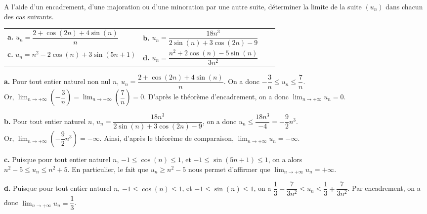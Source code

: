 \documentclass[11pt,fleqn, openany]{book} %
\begin{document}
\begin{exercise}[topic=lim11] A l'aide d'un encadrement, d'une majoration ou d'une minoration par une autre suite, déterminer la limite de la suite $(u_n)$ dans chacun des cas suivants.
\renewcommand{\arraystretch}{2}
\begin{center}
\begin{tabularx}{\linewidth}{XXXX}
\textbf{a.} $ u_n = \dfrac{2+\cos(2n)+4\sin(n)}{n}$ &\textbf{b.}  $ u_n=\dfrac{18n^3}{2\sin(n)+3\cos(2n)-9}$ \\
\textbf{c.} $ u_n=n^2-2\cos(n)+3\sin(5n+1)$  &\textbf{d.}  $u_n = \dfrac{n^2+2\cos(n)-5\sin(n)}{3n^2}$ \\
\end{tabularx}
\end{center}\end{exercise}

\begin{solution}\textbf{a.} Pour tout entier naturel non nul $n$, $u_n=\dfrac{2+\cos(2n)+4\sin(n)}{n}$. On a donc $-\dfrac{3}{n} \leqslant u_n \leqslant \dfrac{7}{n}$. \\ Or, $\displaystyle \lim_{n\to + \infty} \left( -\dfrac{3}{n}\right)=\displaystyle \lim_{n\to + \infty} \left( \dfrac{7}{n}\right)=0$. D'après le théorème d'encadrement, on a donc $\displaystyle \lim_{n\to + \infty} u_n=0$.

\textbf{b.} Pour tout entier naturel $n$, $u_n=\dfrac{18n^3}{2\sin(n)+3\cos(2n)-9}$, on a donc $u_n \leqslant \dfrac{18n^3}{-4}=-\dfrac{9}{2}n^3$. \\ Or, $\displaystyle \lim_{n\to + \infty} \left( -\dfrac{9}{2}n^3 \right)=-\infty$. Ainsi, d'après le théorème de comparaison, $\displaystyle \lim_{n\to + \infty} u_n = -\infty$.

\textbf{c.} Puisque pour tout entier naturel $n$, $-1\leqslant \cos(n) \leqslant 1$, et $-1 \leqslant \sin(5n+1) \leqslant 1$, on a alors \\$ n^2-5 \leqslant u_n \leqslant n^2+5$. En particulier, le fait que $u_n \geqslant n^2-5$ nous permet d'affirmer que $\displaystyle\lim_{n \to + \infty} u_n=+\infty $.


\textbf{d.} Puisque pour tout entier naturel $n$, $-1\leqslant \cos(n) \leqslant 1$, et $-1 \leqslant \sin(n) \leqslant 1$, on a $\dfrac{1}{3}-\dfrac{7}{3n^2}\leqslant u_n \leqslant \dfrac{1}{3}+\dfrac{7}{3n^2}$. Par encadrement, on a donc $\displaystyle\lim_{n \to + \infty}u_n=\dfrac{1}{3}$.\end{solution}
\end{document}
